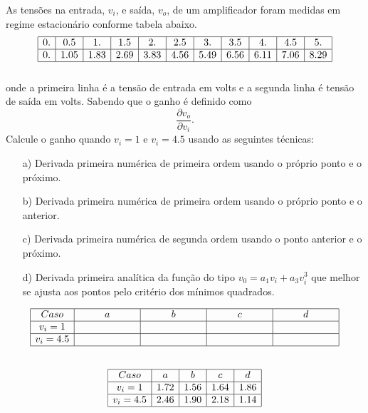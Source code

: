 \begin{exer} As tensões  na entrada, $v_i$, e saída, $v_o$, de um amplificador foram medidas em regime estacionário conforme tabela abaixo.
$$\begin{array}{|c|c|c|c|c|c|c|c|c|c|c|}\hline
    0. &   0.5  &   1.   &   1.5  &   2. &     2.5   &  3.  &    3.5  &   4.  &    4.5  &   5.\\ \hline
 0.  &  1.05  &  1.83  &  2.69  &  3.83 &   4.56 &   5.49 &   6.56  &  6.11 &   7.06  &  8.29\\ \hline
\multicolumn{11}{c}{}
\end{array}
$$
onde  a primeira linha é a tensão de entrada em volts e a segunda linha é tensão de saída em volts.
Sabendo que o ganho é definido como $$\frac{\partial v_o}{\partial v_i}.$$ Calcule o ganho quando $v_i=1$ e $v_i=4.5$ usando as seguintes técnicas:
\begin{itemize}
\item[a)] Derivada primeira numérica de primeira ordem usando o próprio ponto e o próximo.
\item[b)] Derivada primeira numérica de primeira ordem usando o próprio ponto e o anterior.
\item[c)] Derivada primeira numérica de segunda ordem usando o ponto anterior e o próximo.
\item[d)] Derivada primeira analítica da função do tipo $v_0=a_1 v_i + a_3 v_i^3$ que melhor se ajusta aos pontos pelo critério dos mínimos quadrados.
\end{itemize}
$$\begin{array}{|c|c|c|c|c|}\hline
 Caso &  a  &   b &   c   &   d \\ \hline
 v_i=1 &    & ~\hspace{50pt}~  &   & ~\hspace{50pt}~ \\ \hline
v_i=4.5 &~\hspace{50pt}~    &   &  ~\hspace{50pt}~   &\\ \hline
\multicolumn{5}{c}{}
\end{array}
$$
\end{exer}
\begin{resp}
  
$$\begin{array}{|c|c|c|c|c|}\hline
 Caso &  a  &   b &   c   &   d \\ \hline
 v_i=1 & 1.72   & 1.56  &  1.64 & 1.86 \\ \hline
v_i=4.5 &2.46    & 1.90  &  2.18  &1.14  \\ \hline
\multicolumn{5}{c}{}
\end{array}
$$    
  
\end{resp}

